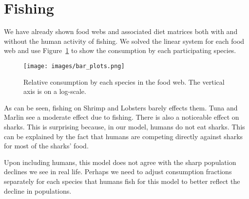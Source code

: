 \section{Fishing}
\label{sec:fishing}

We have already shown food webs and associated diet matrices both with and without the human activity of fishing.
We solved the linear system for each food web and use Figure~\ref{fig:bar-plots} to show the consumption by each participating species.

\begin{figure}[ht!]
   \centering
   \texttt{[image: images/bar\_plots.png]}
   \caption{Relative consumption by each species in the food web. The vertical axis is on a log-scale.}
   \label{fig:bar-plots}
\end{figure}

As can be seen, fishing on Shrimp and Lobsters barely effects them.
Tuna and Marlin see a moderate effect due to fishing.
There is also a noticeable effect on sharks.
This is surprising because, in our model, humans do not eat sharks.
This can be explained by the fact that humans are competing directly against sharks for most of the sharks' food.

Upon including humans, this model does not agree with the sharp population declines we see in real life.
Perhaps we need to adjust consumption fractions separately for each species that humans fish for this model to better reflect the decline in populations.